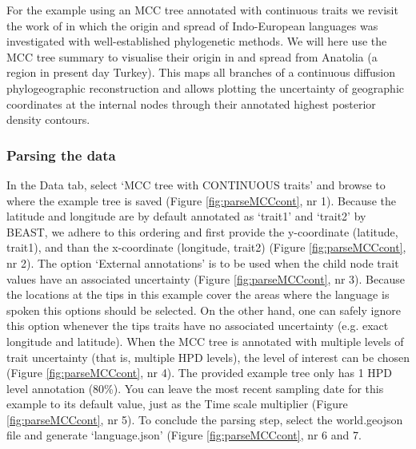 \documentclass[english]{paper}
\begin{document}
For the example using an MCC tree annotated with continuous traits we revisit the work of \citet{Bouckaert:2012aa} in which the origin and spread of Indo-European languages was investigated with well-established phylogenetic methods.
We will here use the MCC tree summary to visualise their origin in and spread from Anatolia (a region in present day Turkey). 
This maps all branches of a continuous diffusion phylogeographic reconstruction and allows plotting the uncertainty of geographic coordinates at the internal nodes through their annotated highest posterior density contours.

\subsubsection{Parsing the data}
\label{MCCcontParse}

In the Data tab, select `MCC tree with CONTINUOUS traits' and browse to where the example tree is saved (Figure \ref{fig:parseMCCcont}, nr 1).
Because the latitude and longitude are by default annotated as `trait1' and `trait2' by BEAST, we adhere to this ordering and first provide the y-coordinate (latitude, trait1), and than the x-coordinate (longitude, trait2) (Figure \ref{fig:parseMCCcont}, nr 2).
The option `External annotations' %
is to be used when the child node trait values have an associated uncertainty (Figure \ref{fig:parseMCCcont}, nr 3).
Because the locations at the tips in this example cover the areas where the language is spoken this options should be selected.
On the other hand, one can safely ignore this option whenever the tips traits have no associated uncertainty (e.g. exact longitude and latitude). 
When the MCC tree is annotated with multiple levels of trait uncertainty (that is, multiple HPD levels), the level of interest can be chosen (Figure \ref{fig:parseMCCcont}, nr 4).
The provided example tree only has 1 HPD level annotation (80\%).
You can leave the most recent sampling date for this example to its default value, just as the Time scale multiplier (Figure \ref{fig:parseMCCcont}, nr 5).
To conclude the parsing step, select the world.geojson file and generate `language.json' (Figure \ref{fig:parseMCCcont}, nr 6 and 7.
\end{document}
